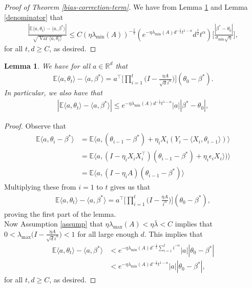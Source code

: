 \documentclass[11pt, reqno,english]{amsart}
\DeclareMathOperator{\Var}{Var} \DeclareMathOperator{\N}{N}
\newtheorem{lemma}{Lemma}[section]
\begin{document}
\begin{proof}[Proof of Theorem \ref{bias-correction-term}]
We have from Lemma \ref{lem:bias-expression} and Lemma \ref{denominator} that
\begin{align*}
\frac{|\mathbb{E}\langle a, \theta_t \rangle - \langle a, \beta^* \rangle|}{\sqrt{\Var \langle a, \theta_t \rangle}} \leq C(\eta \lambda_{\min}(A))^{-\frac{1}{2}}(e^{-\eta \lambda_{\min}(A)d^{-\frac{1}{2}}t^{1-\alpha}}d^{\frac{1}{2}}t^{\alpha})\bigg[\frac{|\beta^* - \theta_0|}{\sigma_{\min}\sqrt{\eta}}\bigg],
\end{align*}
for all $t,d \geq C$, as desired.
\end{proof}
\begin{lemma}\label{lem:bias-expression}
We have for all $a \in \mathbb{R}^d$ that
\begin{align*}
\mathbb{E}\langle a, \theta_t \rangle - \langle a, \beta^* \rangle = a^\top \bigg[\prod_{i = 1}^t \bigg(I - \frac{\eta A}{\sqrt{d}i^{\alpha}}\bigg)\bigg] (\theta_0 - \beta^*).
\end{align*}
In particular, we also have that
\begin{align*}
|\mathbb{E}\langle a, \theta_t \rangle - \langle a, \beta^* \rangle| \leq e^{-\eta \lambda_{\min}(A)d^{-\frac{1}{2}}t^{1-\alpha}}|a||\beta^* - \theta_0|,
\end{align*}
\end{lemma}
\begin{proof}
Observe that
\begin{align*}
\mathbb{E}\langle a, \theta_i - \beta^* \rangle &= \mathbb{E}\langle a, (\theta_{i-1} - \beta^*) + \eta_i X_i(Y_i - \langle X_i , \theta_{i-1} \rangle) \rangle
\\
&=  \mathbb{E}\langle a, (I - \eta_i  X_i X_i^\top)(\theta_{i - 1} - \beta^*) + \eta_i \epsilon_i X_i\rangle) \rangle
\\
&= \mathbb{E}\langle a, (I - \eta_i A)(\theta_{i - 1} - \beta^*) \rangle
\end{align*}
Multiplying these from $i = 1$ to $t$ gives us that
\begin{align*}
\mathbb{E}\langle a, \theta_t \rangle - \langle a, \beta^* \rangle = a^\top \bigg[\prod_{i = 1}^t \bigg(I - \frac{\eta A}{i^{\alpha}}\bigg)\bigg] (\theta_0 - \beta^*),
\end{align*}
proving the first part of the lemma. 
\\
Now Assumption \ref{assump} that $\eta \lambda_{\max}(A)< \eta \bar{\lambda} < C$ implies that $0 < \lambda_{\max}\bigg(I - \frac{\eta A}{\sqrt{d}i^{\alpha}}\bigg) < 1$ for all large enough $d$. This implies that
\begin{align*}
    \mathbb{E}\langle a, \theta_t \rangle - \langle a, \beta^* \rangle &< e^{-\eta \lambda_{\min}(A) d^{-\frac{1}{2}}\sum_{i=1}^t i^{-\alpha}}|a||\theta_0 - \beta^*| \\
    &< e^{-\eta \lambda_{\min}(A) d^{-\frac{1}{2}}t^{1 - \alpha}}|a||\theta_0 - \beta^*|,
\end{align*}
for  all $t,d \geq C$, as desired.
\end{proof}
\end{document}
